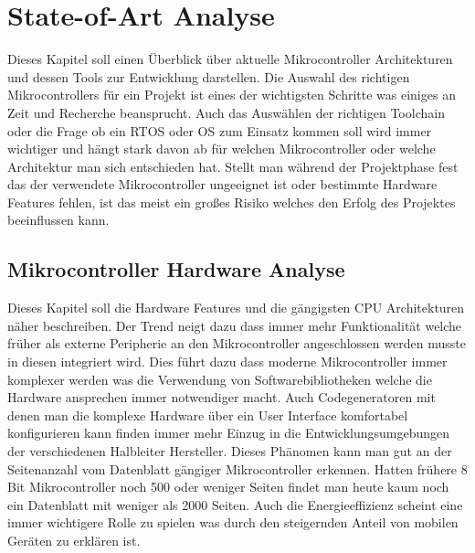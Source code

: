 \documentclass[MES,Master,ngerman]{twbook}%
\begin{document}
{{{    \newcommand{\citefigm}[2]{(Source: taken with modification from \protect\cite{#1}, p. #2)}%
    \newcommand{\citep}{\citeasnoun}%
    \newcommand{\acessedthrough}{Available at:}%
    \newcommand{\acessedthroughp}{Available through:}%
    \newcommand{\acessedat}{Accessed}%
    \newcommand{\singlepage}{p.}%
    \newcommand{\multiplepages}{pp.}%
    \newcommand{\chapternr}{Ch.}%
    \renewcommand{\harvardand}{\&}%
    \newcommand{\abstractonly}{Abstract only}
    \newcommand{\edition}{~edition}%
}}}

\maketitle


%
%
\chapter{State-of-Art Analyse}
Dieses Kapitel soll einen Überblick über aktuelle Mikrocontroller Architekturen und dessen Tools zur Entwicklung darstellen. Die Auswahl des richtigen Mikrocontrollers für ein Projekt ist eines der wichtigsten Schritte was einiges an Zeit und Recherche beansprucht. Auch das Auswählen der richtigen Toolchain oder die Frage ob ein RTOS oder OS zum Einsatz kommen soll wird immer wichtiger und hängt stark davon ab für welchen Mikrocontroller oder welche Architektur man sich entschieden hat. Stellt man während der Projektphase fest das der verwendete Mikrocontroller ungeeignet ist oder bestimmte Hardware Features fehlen, ist das meist ein großes Risiko welches den Erfolg des Projektes beeinflussen kann.  
\section{Mikrocontroller Hardware Analyse}
Dieses Kapitel soll die Hardware Features und die gängigsten CPU Architekturen näher beschreiben. Der Trend neigt dazu dass immer mehr Funktionalität welche früher als externe Peripherie an den Mikrocontroller angeschlossen werden musste in diesen integriert wird. Dies führt dazu dass moderne Mikrocontroller immer komplexer werden was die Verwendung von Softwarebibliotheken welche die Hardware ansprechen immer notwendiger macht. Auch Codegeneratoren mit denen man die komplexe Hardware über ein User Interface komfortabel konfigurieren kann finden immer mehr Einzug in die Entwicklungsumgebungen der verschiedenen Halbleiter Hersteller. Dieses Phänomen kann man gut an der Seitenanzahl vom Datenblatt gängiger Mikrocontroller erkennen. Hatten frühere 8 Bit Mikrocontroller noch 500 oder weniger Seiten findet man heute kaum noch ein Datenblatt mit weniger als 2000 Seiten. Auch die Energieeffizienz scheint eine immer wichtigere Rolle zu spielen was durch den steigernden Anteil von mobilen Geräten zu erklären ist. 
\newpage
\end{document}

